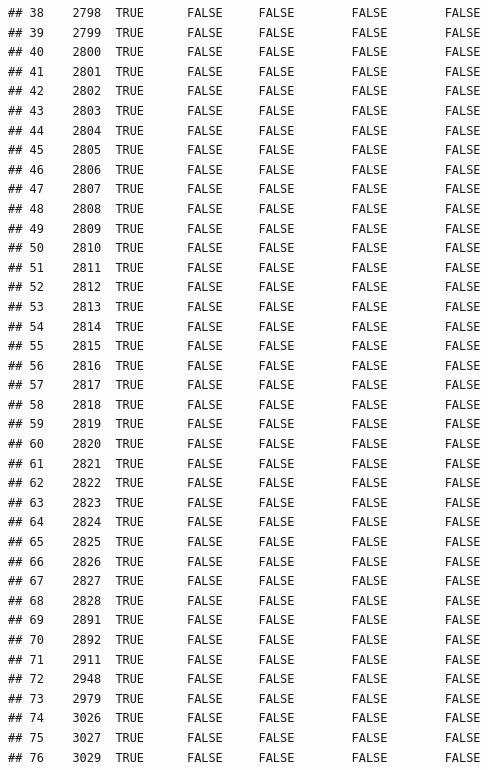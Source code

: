 \documentclass[
  10pt,
  b5paper,
  oneside]{book}
\begin{document}
\begin{verbatim}
## 38    2798  TRUE      FALSE     FALSE        FALSE        FALSE
## 39    2799  TRUE      FALSE     FALSE        FALSE        FALSE
## 40    2800  TRUE      FALSE     FALSE        FALSE        FALSE
## 41    2801  TRUE      FALSE     FALSE        FALSE        FALSE
## 42    2802  TRUE      FALSE     FALSE        FALSE        FALSE
## 43    2803  TRUE      FALSE     FALSE        FALSE        FALSE
## 44    2804  TRUE      FALSE     FALSE        FALSE        FALSE
## 45    2805  TRUE      FALSE     FALSE        FALSE        FALSE
## 46    2806  TRUE      FALSE     FALSE        FALSE        FALSE
## 47    2807  TRUE      FALSE     FALSE        FALSE        FALSE
## 48    2808  TRUE      FALSE     FALSE        FALSE        FALSE
## 49    2809  TRUE      FALSE     FALSE        FALSE        FALSE
## 50    2810  TRUE      FALSE     FALSE        FALSE        FALSE
## 51    2811  TRUE      FALSE     FALSE        FALSE        FALSE
## 52    2812  TRUE      FALSE     FALSE        FALSE        FALSE
## 53    2813  TRUE      FALSE     FALSE        FALSE        FALSE
## 54    2814  TRUE      FALSE     FALSE        FALSE        FALSE
## 55    2815  TRUE      FALSE     FALSE        FALSE        FALSE
## 56    2816  TRUE      FALSE     FALSE        FALSE        FALSE
## 57    2817  TRUE      FALSE     FALSE        FALSE        FALSE
## 58    2818  TRUE      FALSE     FALSE        FALSE        FALSE
## 59    2819  TRUE      FALSE     FALSE        FALSE        FALSE
## 60    2820  TRUE      FALSE     FALSE        FALSE        FALSE
## 61    2821  TRUE      FALSE     FALSE        FALSE        FALSE
## 62    2822  TRUE      FALSE     FALSE        FALSE        FALSE
## 63    2823  TRUE      FALSE     FALSE        FALSE        FALSE
## 64    2824  TRUE      FALSE     FALSE        FALSE        FALSE
## 65    2825  TRUE      FALSE     FALSE        FALSE        FALSE
## 66    2826  TRUE      FALSE     FALSE        FALSE        FALSE
## 67    2827  TRUE      FALSE     FALSE        FALSE        FALSE
## 68    2828  TRUE      FALSE     FALSE        FALSE        FALSE
## 69    2891  TRUE      FALSE     FALSE        FALSE        FALSE
## 70    2892  TRUE      FALSE     FALSE        FALSE        FALSE
## 71    2911  TRUE      FALSE     FALSE        FALSE        FALSE
## 72    2948  TRUE      FALSE     FALSE        FALSE        FALSE
## 73    2979  TRUE      FALSE     FALSE        FALSE        FALSE
## 74    3026  TRUE      FALSE     FALSE        FALSE        FALSE
## 75    3027  TRUE      FALSE     FALSE        FALSE        FALSE
## 76    3029  TRUE      FALSE     FALSE        FALSE        FALSE

\end{verbatim}
\end{document}
